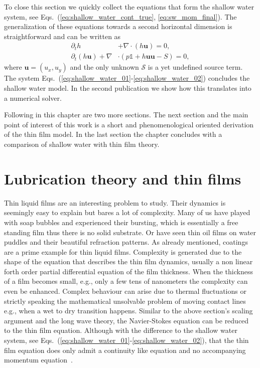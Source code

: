 To close this section we quickly collect the equations that form the shallow water system, see Eqs.~(\ref{eq:shallow_water_cont_true}, \ref{eq:sw_mom_final}).
The generalization of these equations towards a second horizontal dimension is straightforward and can be written as~\cite{salmonLatticeBoltzmannMethod1999, dellarNonhydrodynamicModesPriori2002, thommesLatticeBoltzmannMethods2007}
\begin{align}    
        \partial_t h &+ \nabla \cdot (h\mathbf{u}) = 0, \label{eq:shallow_water_01}\\
        \partial_t (h\mathbf{u}) + \nabla&\cdot (p \mathbb{1} + h\mathbf{u}\mathbf{u} - S) = 0, \label{eq:shallow_water_02} 
\end{align}
where $\mathbf{u} = (u_x, u_y)$ and the only unknown $\mathcal{S}$ is a yet undefined source term. 
The system Eqs.~(\ref{eq:shallow_water_01}-\ref{eq:shallow_water_02}) concludes the shallow water model. 
In the second publication we show how this translates into a numerical solver.

Following in this chapter are two more sections.
The next section and the main point of interest of this work is a short and phenomenological oriented derivation of the thin film model.
In the last section the chapter concludes with a comparison of shallow water with thin film theory.

\section{Lubrication theory and thin films}
\label{sec:thin_films}
Thin liquid films are an interesting problem to study.
Their dynamics is seemingly easy to explain but bares a lot of complexity.
Many of us have played with soap bubbles and experienced their bursting, which is essentially a free standing film thus there is no solid substrate.
Or have seen thin oil films on water puddles and their beautiful refraction patterns.
As already mentioned, coatings are a prime example for thin liquid films. 
Complexity is generated due to the shape of the equation that describes the thin film dynamics, usually a non linear forth order partial differential equation of the film thickness.
When the thickness of a film becomes small, e.g., only a few tens of nanometers the complexity can even be enhanced. 
Complex behaviour can arise due to thermal fluctuations or strictly speaking the mathematical unsolvable problem of moving contact lines e.g., when a wet to dry transition happens.
Similar to the above section's scaling argument and the long wave theory, the Navier-Stokes equation can be reduced to the thin film equation. 
Although with the difference to the shallow water system, see Eqs.~(\ref{eq:shallow_water_01}-\ref{eq:shallow_water_02}), that the thin film equation does only admit a continuity like equation and no accompanying momentum equation~\cite{oronLongscaleEvolutionThin1997, degennesWettingStaticsDynamics1985, crasterDynamicsStabilityThin2009}.

